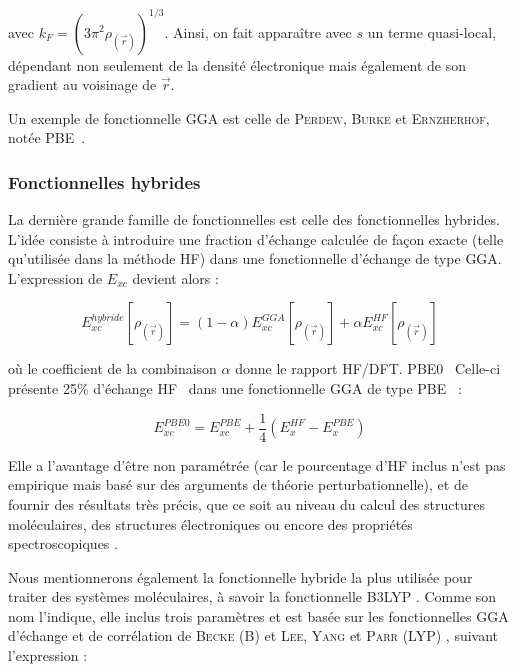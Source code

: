 	\noindent avec $k_{F} = (3 \pi^{2} \rho_{(\vec{r})})^{1/3}$. Ainsi, on fait apparaître avec $s$ un terme quasi-local, dépendant non seulement de la densité électronique mais également de son gradient au voisinage de $\vec{r}$.
	
	Un exemple de fonctionnelle GGA est celle de \textsc{Perdew}, \textsc{Burke} et \textsc{Ernzherhof}, notée PBE~\cite{perdew1996generalized}.
	
	\subsubsection{Fonctionnelles hybrides}
	
	La dernière grande famille de fonctionnelles est celle des fonctionnelles hybrides. L’idée consiste à introduire une fraction d’échange calculée de façon exacte (telle qu’utilisée dans la méthode HF) dans une fonctionnelle d’échange de type GGA. L’expression de $E_{xc}$ devient alors :
	
	\begin{equation}
	E_{xc}^{hybride}[\rho_{(\vec{r})}] = (1- \alpha) E_{xc}^{GGA}[\rho_{(\vec{r})}] + \alpha E_{xc}^{HF}[\rho_{(\vec{r})}]
	\end{equation}
	
	\noindent où le coefficient de la combinaison $\alpha$ donne le rapport HF/DFT.
	PBE0~\cite{adamo1999toward} Celle-ci présente 25\% d’échange HF~\cite{adamo1997toward} dans une fonctionnelle GGA de type PBE~\cite{perdew1996generalized} :
	
	\begin{equation}
	E_{xc}^{PBE0} = E_{xc}^{PBE} + \frac{1}{4} (E_{x}^{HF} - E_{x}^{PBE})
	\end{equation}
	
	Elle a l’avantage d’être non paramétrée (car le pourcentage d’HF inclus n’est pas empirique mais basé sur des arguments de théorie perturbationnelle), et de fournir des résultats très précis, que ce soit au niveau du calcul des structures moléculaires, des structures électroniques ou encore des propriétés spectroscopiques \cite{adamo1999toward}.
	
	Nous mentionnerons également la fonctionnelle hybride la plus utilisée pour traiter des systèmes moléculaires, à savoir la fonctionnelle B3LYP \cite{becke1993density}. Comme son nom l’indique, elle inclus trois paramètres et est basée sur les fonctionnelles GGA d’échange et de corrélation de \textsc{Becke} (B) \cite{becke1988density} et \textsc{Lee}, \textsc{Yang} et \textsc{Parr} (LYP) \cite{chengteh1988development}, suivant l’expression :
	
